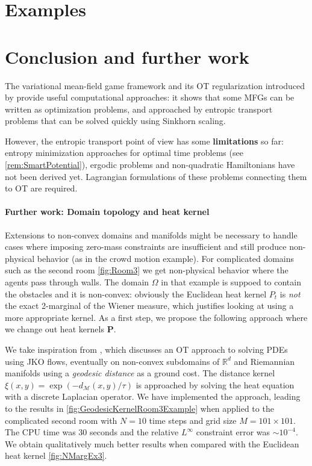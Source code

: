 \documentclass[11pt]{article}
\newcommand{\RR}{\mathbb{R}}
\newcommand{\bfP}{\mathbf{P}}
\newcommand{\calM}{\mathcal{M}}
\numberwithin{equation}{section}
\theoremstyle{definition}
\begin{document}




\section{Examples}\label{sec:Examples}




\section{Conclusion and further work}

The variational mean-field game framework and its OT regularization introduced by \textcite{benamou:hal-01295299,benamou2018entropy} provide useful computational approaches: it shows that some MFGs can be written as optimization problems, and approached by entropic transport problems that can be solved quickly using Sinkhorn scaling.

However, the entropic transport point of view has some \textbf{limitations} so far: entropy minimization approaches for optimal time problems (see \cref{rem:SmartPotential}), ergodic problems and non-quadratic Hamiltonians have not been derived yet. Lagrangian formulations of these problems connecting them to OT are required.

\paragraph{Further work: Domain topology and heat kernel}\label{sec:ExtensionTopologyHeatKernel} Extensions to non-convex domains and manifolds might be necessary to handle cases where imposing zero-mass constraints are insufficient and still produce non-physical behavior (as in the crowd motion example). 
For complicated domains such as the second room \cref{fig:Room3} we get non-physical behavior where the agents pass through walls. The domain $\Omega$ in that example is suppoed to contain the obstacles and it is non-convex: obviously the Euclidean heat kernel $P_t$ is \textit{not} the exact 2-marginal of the Wiener measure, which justifies looking at using a more appropriate kernel. As a first step, we propose the following approach where we change out heat kernels $\bfP$.

We take inspiration from \textcite{peyr2015entropic}, which discusses an OT approach to solving PDEs using JKO flows, eventually on non-convex subdomains of $\RR^d$ and Riemannian manifolds using a \textit{geodesic distance} as a ground cost. The distance kernel $\xi(x,y) = \exp(-d_\calM(x,y)/\tau)$ is approached by solving the heat equation with a discrete Laplacian operator.
We have implemented the approach, leading to the results in \cref{fig:GeodesicKernelRoom3Example} when applied to the complicated second room with $N=10$ time steps and grid size $M=101\times 101$. The CPU time was $30$ seconds and the relative $L^\infty$ constraint error was $\sim 10^{-4}$. We obtain qualitatively much better results when compared with the Euclidean heat kernel \cref{fig:NMargEx3}.
\end{document}

